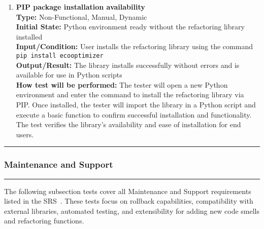 \documentclass[12pt, titlepage]{article}
\newcommand{\colorrule}{\textcolor{BlueViolet}{\rule{\linewidth}{2pt}}}
\begin{document}
\begin{enumerate}[label={\bf \textcolor{Maroon}{test-OPE-\arabic*}}, wide=0pt, font=\itshape]
  \item \textbf{PIP package installation availability} \\[2mm]
    \textbf{Type:} Non-Functional, Manual, Dynamic \\
    \textbf{Initial State:} Python environment ready without the refactoring library installed \\
    \textbf{Input/Condition:} User installs the refactoring library using the command \texttt{pip install ecooptimizer} \\
    \textbf{Output/Result:} The library installs successfully without errors and is available for use in Python scripts \\[2mm]
    \textbf{How test will be performed:} The tester will open a new Python environment and enter the command to install the refactoring library via PIP. Once installed, the tester will import the library in a Python script and execute a basic function to confirm successful installation and functionality. The test verifies the library’s availability and ease of installation for end users.

\end{enumerate}

\noindent
\colorrule

\subsubsection{Maintenance and Support}
\colorrule

\medskip

\noindent
The following subsection tests cover all Maintenance and Support requirements listed in the SRS~\cite{SRS}. These tests focus on rollback capabilities, compatibility with external libraries, automated testing, and extensibility for adding new code smells and refactoring functions.
\end{document}
